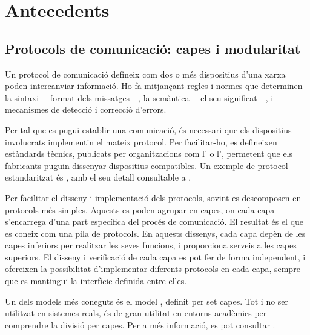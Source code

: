 \documentclass{tfgitic}[2024/07/01]
\begin{document}
\chapter{Antecedents}
\section{Protocols de comunicació: capes i modularitat}
\label{sec:protocols}
Un protocol de comunicació defineix com dos o més dispositius d'una xarxa poden intercanviar informació. Ho fa mitjançant regles i normes que determinen la sintaxi ---format dels missatges---, la semàntica ---el seu significat---, i mecanismes de detecció i correcció d'errors.

Per tal que es pugui establir una comunicació, és necessari que els dispositius involucrats implementin el mateix protocol. Per facilitar-ho, es defineixen estàndards tècnics, publicats per organitzacions com l' o l', permetent que els fabricants puguin dissenyar dispositius compatibles. Un exemple de protocol estandaritzat és , amb el seu detall consultable a \cite{fielding_hypertext_2014}.

Per facilitar el disseny i implementació dels protocols, sovint es descomposen en protocols més simples. Aquests es poden agrupar en capes, on cada capa s'encarrega d'una part específica del procés de comunicació. El resultat és el que es coneix com una pila de protocols. 
En aquests dissenys, cada capa depèn de les capes inferiors per realitzar les seves funcions, i proporciona serveis a les capes superiors. El disseny i verificació de cada capa es pot fer de forma independent, i ofereixen la possibilitat d'implementar diferents protocols en cada capa, sempre que es mantingui la interfície definida entre elles.

Un dels models més coneguts és el model , definit per set capes. Tot i no ser utilitzat en sistemes reals, és de gran utilitat en entorns acadèmics per comprendre la divisió per capes. Per a més informació, es pot consultar \cite{noauthor_isoiec_1994}.
\end{document}

